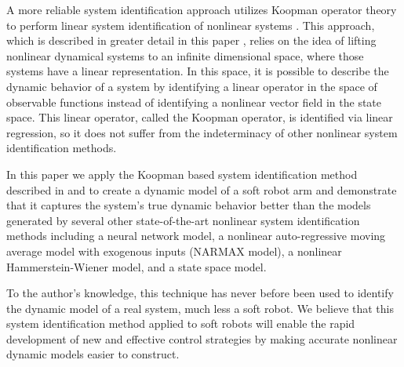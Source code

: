 A more reliable system identification approach utilizes Koopman operator theory to perform linear system identification of nonlinear systems .
This approach, which is described in greater detail in this paper , relies on the idea of lifting nonlinear dynamical systems to an infinite dimensional space, where those systems have a linear representation.
In this space, it is possible to describe the dynamic behavior of a system by identifying a linear operator in the space of observable functions instead of identifying a nonlinear vector field in the state space.
This linear operator, called the Koopman operator, is identified via linear regression, so it does not suffer from the indeterminacy of other nonlinear system identification methods.

In this paper we apply the Koopman based system identification method described in \cite{mauroy2016linear} and \cite{mauroy2017koopman} to create a dynamic model of a soft robot arm and demonstrate that it captures the system's true dynamic behavior better than the models generated by several other state-of-the-art nonlinear system identification methods including a neural network model, a nonlinear auto-regressive moving average model with exogenous inputs (NARMAX model), a nonlinear Hammerstein-Wiener model, and a state space model.

To the author's knowledge, this technique has never before been used to identify the dynamic model of a real system, much less a soft robot.
We believe that this system identification method applied to soft robots will enable the rapid development of new and effective control strategies by making accurate nonlinear dynamic models easier to construct.

